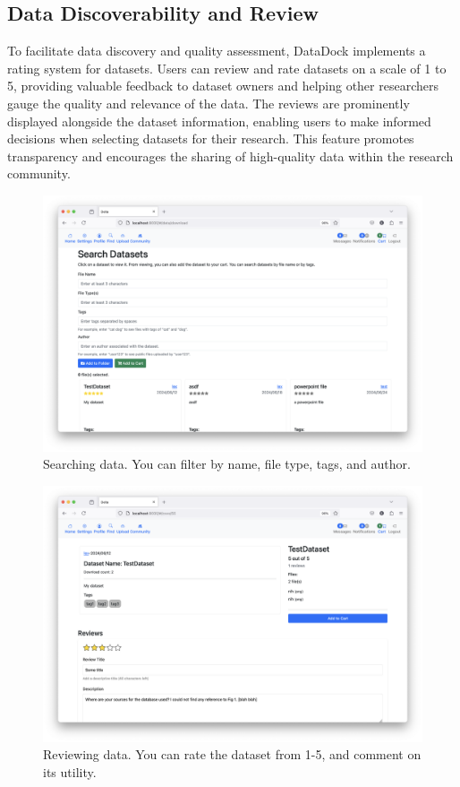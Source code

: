 \documentclass[conference]{IEEEtran}
\begin{document}
\subsection{Data Discoverability and Review}
To facilitate data discovery and quality assessment, DataDock implements a rating system for datasets. Users can review and rate datasets on a scale of 1 to 5, providing valuable feedback to dataset owners and helping other researchers gauge the quality and relevance of the data. The reviews are prominently displayed alongside the dataset information, enabling users to make informed decisions when selecting datasets for their research. This feature promotes transparency and encourages the sharing of high-quality data within the research community.
\begin{figure}[h]
  \centering
  \includegraphics[width=\columnwidth]{figures/search.png}
  \caption{Searching data. You can filter by name, file type, tags, and author.}
  \label{fig:delta-search}
\end{figure}
\begin{figure}[h]
  \centering
  \includegraphics[width=\columnwidth]{figures/review.png}
  \caption{Reviewing data. You can rate the dataset from 1-5, and comment on its utility.}
  \label{fig:delta-review}
\end{figure}
\end{document}

